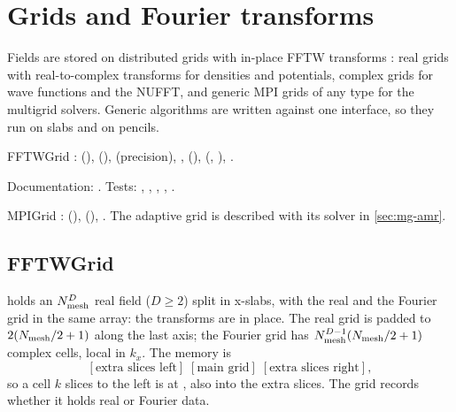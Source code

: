 \chapter{Grids and Fourier transforms}\label{ch:grids-fft}

Fields are stored on distributed grids with in-place FFTW transforms \cite{Frigo2005}: real grids with real-to-complex
transforms for densities and potentials, complex grids for wave functions and the NUFFT, and generic MPI grids of any type
for the multigrid solvers. Generic algorithms are written against one interface, so they run on slabs and on pencils.

\begin{modulebox}{FFTWGrid}
:  (),  (),
 (precision), , 
(),  (, ),
.\par
Documentation: . Tests: , ,
, , .
\end{modulebox}
\begin{modulebox}{MPIGrid}
:  (),  (),
. The adaptive grid  is described with its solver in
\cref{sec:mg-amr}.
\end{modulebox}

\section{FFTWGrid}\label{sec:grids-fftwgrid}

 holds an $N_{\rm mesh}^D$ real field ($D\ge2$) split in x-slabs, with the real and the Fourier grid in the
same array: the transforms are in place. The real grid is padded to $2(N_{\rm mesh}/2+1)$ along the last axis; the Fourier
grid has $N_{\rm mesh}^{D-1}(N_{\rm mesh}/2+1)$ complex cells, local in $k_x$. The memory is
\[
[\text{extra slices left}]\;[\text{main grid}]\;[\text{extra slices right}],
\]
so a cell $k$ slices to the left is at , also into the extra slices. The grid records whether it
holds real or Fourier data.


